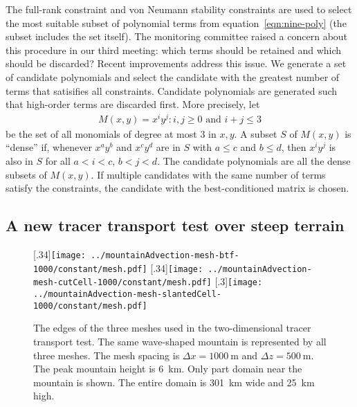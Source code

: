 \documentclass[a4paper,11pt]{article}
\begin{document}
The full-rank constraint and von Neumann stability constraints are used to select the most suitable subset of polynomial terms from equation~\eqref{eqn:nine-poly} (the subset includes the set itself).
The monitoring committee raised a concern about this procedure in our third meeting: which terms should be retained and which should be discarded?  Recent improvements address this issue.  We generate a set of candidate polynomials and select the candidate with the greatest number of terms that satisifies all constraints.  Candidate polynomials are generated such that high-order terms are discarded first.  More precisely, let
\begin{align}
	M(x, y) = { x^i y^j : i,j \geq 0 \text{ and } i+j \leq 3 }
\end{align}
be the set of all monomials of degree at most \num{3} in $x, y$.
A subset $S$ of $M(x,y)$ is ``dense'' if, whenever $x^a y^b$ and $x^c y^d$ are in $S$ with $a \leq c$ and $b \leq d$, then $x^i y^j$ is also in $S$ for all $a < i < c$, $b < j < d$.  The candidate polynomials are all the dense subsets of $M(x,y)$.  If multiple candidates with the same number of terms satisfy the constraints, the candidate with the best-conditioned matrix is chosen.

\subsection*{A new tracer transport test over steep terrain}

\begin{figure}
	\centering
	[.34\linewidth]{\texttt{[image: ../mountainAdvection-mesh-btf-1000/constant/mesh.pdf]}}
	[.34\linewidth]{\texttt{[image: ../mountainAdvection-mesh-cutCell-1000/constant/mesh.pdf]}}
	[.3\linewidth]{\texttt{[image: ../mountainAdvection-mesh-slantedCell-1000/constant/mesh.pdf]}}
	\caption{The edges of the three meshes used in the two-dimensional tracer transport test.  The same wave-shaped mountain is represented by all three meshes.  The mesh spacing is $\Delta x = \SI{1000}{\meter}$ and $\Delta z = \SI{500}{\meter}$.  The peak mountain height is \SI{6}{\kilo\meter}.  Only part domain near the mountain is shown.  The entire domain is \SI{301}{\kilo\meter} wide and \SI{25}{\kilo\meter} high.}
	\label{fig:meshes}
\end{figure}
\end{document}
